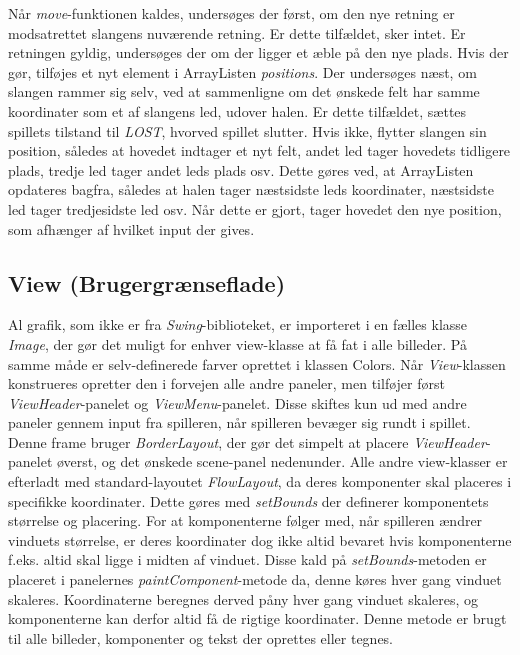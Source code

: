 \documentclass{report}
\begin{document}
Når \textit{move}-funktionen kaldes, undersøges der først, om den nye retning er modsatrettet slangens nuværende retning. Er dette tilfældet, sker intet. Er retningen gyldig, undersøges der om der ligger et æble på den nye plads. Hvis der gør, tilføjes et nyt element i ArrayListen \textit{positions}.
Der undersøges næst, om slangen rammer sig selv, ved at sammenligne om det ønskede felt har samme koordinater som et af slangens led, udover halen. Er dette tilfældet, sættes spillets tilstand til \textit{LOST}, hvorved spillet slutter. Hvis ikke, flytter slangen sin position, således at hovedet indtager et nyt felt, andet led tager hovedets tidligere plads, tredje led tager andet leds plads osv. Dette gøres ved, at ArrayListen opdateres bagfra, således at halen tager næstsidste leds koordinater, næstsidste led tager tredjesidste led osv. Når dette er gjort, tager hovedet den nye position, som afhænger af hvilket input der gives.


\subsection{View (Brugergrænseflade)}
Al grafik, som ikke er fra \textit{Swing}-biblioteket, er importeret i en fælles klasse \textit{Image}, der gør det muligt for enhver view-klasse at få fat i alle billeder. På samme måde er selv-definerede farver oprettet i klassen Colors.
Når \textit{View}-klassen konstrueres opretter den i forvejen alle andre paneler, men tilføjer først \textit{ViewHeader}-panelet og \textit{ViewMenu}-panelet. Disse skiftes kun ud med andre paneler gennem input fra spilleren, når spilleren bevæger sig rundt i spillet. Denne frame bruger \textit{BorderLayout}, der gør det simpelt at placere \textit{ViewHeader}-panelet øverst, og det ønskede scene-panel nedenunder. Alle andre view-klasser er efterladt med standard-layoutet \textit{FlowLayout}, da deres komponenter skal placeres i specifikke koordinater. Dette gøres med \textit{setBounds} der definerer komponentets størrelse og placering. For at komponenterne følger med, når spilleren ændrer vinduets størrelse, er deres koordinater dog ikke altid bevaret hvis komponenterne f.eks. altid skal ligge i midten af vinduet. Disse kald på \textit{setBounds}-metoden er placeret i panelernes \textit{paintComponent}-metode da, denne køres hver gang vinduet skaleres. Koordinaterne beregnes derved påny hver gang vinduet skaleres, og komponenterne kan derfor altid få de rigtige koordinater. Denne metode er brugt til alle billeder, komponenter og tekst der oprettes eller tegnes.
\end{document}
